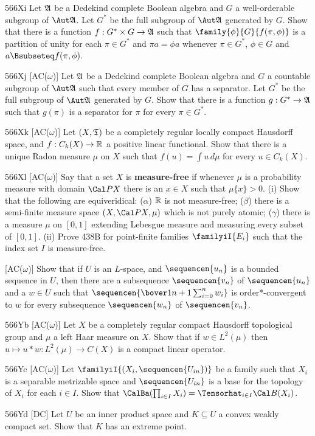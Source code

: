 {\spheader 566Xi Let $\frak A$ be a Dedekind complete Boolean
algebra and $G$ a well-orderable subgroup of $\Aut\frak A$.
Let $G^*$ be the full subgroup of $\Aut\frak A$ generated by $G$.
Show that there is a function
$f:G^*\times G\to\frak A$ such that $\family{\phi}{G}{f(\pi,\phi)}$ is a
partition of unity for each $\pi\in G^*$ and $\pi a=\phi a$ whenever
$\pi\in G^*$, $\phi\in G$ and $a\Bsubseteq f(\pi,\phi)$.   

\spheader 566Xj [AC($\omega$)]
Let $\frak A$ be a Dedekind complete Boolean algebra and
$G$ a countable subgroup of $\Aut\frak A$ such that every
member of $G$ has a separator.   Let $G^*$ be the full subgroup
of $\Aut\frak A$ generated by $G$.    Show that there is a
function
$g:G^*\to\frak A$ such that $g(\pi)$ is a separator for $\pi$ for every
$\pi\in G^*$.   

\spheader 566Xk [AC($\omega$)] Let $(X,\frak T)$ be a completely regular
locally compact Hausdorff space, and $f:C_k(X)\to\Bbb R$ a positive
linear functional.   Show that
there is a unique Radon measure $\mu$ on $X$ such that
$f(u)=\int u\,d\mu$ for every $u\in C_k(X)$.

\spheader 566Xl [AC($\omega$)]
Say that a set $X$ is {\bf measure-free} if whenever $\mu$
is a probability measure with domain $\Cal PX$ there is an $x\in X$ such
that $\mu\{x\}>0$.   (i) Show that
the following are equiveridical:
($\alpha$) $\Bbb R$ is not measure-free;
($\beta$) there is a semi-finite measure space $(X,\Cal PX,\mu)$ which
is not purely atomic;
($\gamma$) there is a measure $\mu$ on $[0,1]$ extending Lebesgue
measure and measuring every subset of $[0,1]$.
(ii) Prove 438B for point-finite families $\familyiI{E_i}$ such that
the index set $I$ is measure-free.

[AC($\omega$)] Show that if $U$ is an $L$-space, and
$\sequencen{u_n}$ is a bounded sequence in $U$, then there are a
subsequence $\sequencen{v_n}$ of $\sequencen{u_n}$ and a $w\in U$ such that
$\sequencen{\bover1{n+1}\sum_{i=0}^nw_i}$ is order*-convergent to $w$ for
every subsequence $\sequencen{w_n}$ of $\sequencen{v_n}$.   

\spheader 566Yb [AC($\omega$)] Let
$X$ be a completely regular compact Hausdorff topological group and $\mu$ a
left Haar measure on $X$.   Show that if $w\in L^2(\mu)$ then
$u\mapsto u*w:L^2(\mu)\to C(X)$ is a
compact linear operator.   

\spheader 566Yc [AC($\omega$)]
Let $\familyiI{(X_i,\sequencen{U_{in}})}$ be a family such
that $X_i$ is a separable metrizable space and $\sequencen{U_{in}}$ is a
base for the topology of $X_i$ for each $i\in I$.   Show that
$\CalBa(\prod_{i\in I}X_i)=\Tensorhat_{i\in I}\Cal B(X_i)$.

\spheader 566Yd
[DC] Let $U$ be an inner product space and $K\subseteq U$
a convex weakly compact set.   Show that $K$ has an extreme point.
}%

